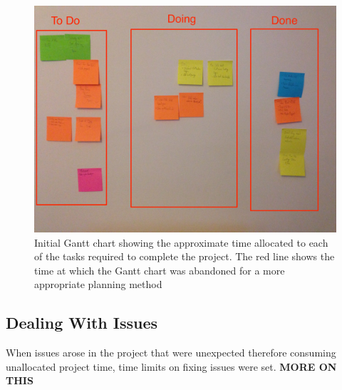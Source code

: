 \documentclass[../../main.tex]{subfiles}
\begin{document}
	\begin{center}
	\begin{figure}[H]
		\vspace{50mm}\centerline{\includegraphics[scale = 0.15]{Sections/ProjectManagement/images/kanban_edit.jpg}}
		\caption{Initial Gantt chart showing the approximate time allocated to each of the tasks required to complete the project. The red line shows the time at which the Gantt chart was abandoned for a more appropriate planning method}
		\label{kanban}
	\end{figure}
	\end{center}

	\subsection{Dealing With Issues}

		When issues arose in the project that were unexpected therefore consuming unallocated project time, time limits on fixing issues were set. \textbf{MORE ON THIS}

\end{document}
